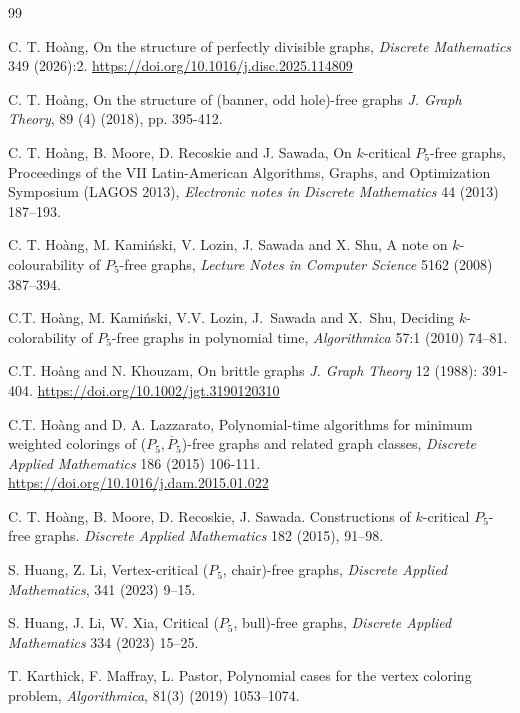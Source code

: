 \documentclass[a4paper,11pt]{article}
\theoremstyle{case}
\begin{document}
\begin{thebibliography}{99}

C. T. Ho\`ang,
On the structure of perfectly divisible graphs,
{\it Discrete Mathematics} 349 (2026):2. 
\url{https://doi.org/10.1016/j.disc.2025.114809}

C. T. Ho\`ang, On the structure of (banner, odd hole)-free graphs
{\it J. Graph Theory}, 89 (4) (2018), pp. 395-412.

    C. T. Ho\`ang, B. Moore, D. Recoskie and J. Sawada,
    On $k$-critical $P_5$-free graphs, Proceedings of the VII Latin-American
    Algorithms, Graphs, and Optimization Symposium (LAGOS 2013), {\sl
    Electronic notes in Discrete Mathematics} 44 (2013) 187--193.

    C. T. Ho\`{a}ng, M. Kami\'nski, V. Lozin, J. Sawada and X. Shu,
    A note on $k$-colourability of $P_5$-free graphs,
    {\sl Lecture Notes in Computer Science} 5162 (2008)
    387--394.

    C.T. Ho\`ang, M. Kami\'nski, V.V. Lozin, J.~Sawada and X.~Shu,
    Deciding $k$-colorability of $P_5$-free graphs in polynomial time,
    {\sl Algorithmica} 57:1  (2010) 74--81.

 C.T. Ho\`ang and N. Khouzam, On brittle graphs {\it J. Graph Theory}  12 (1988): 391-404. 
 \url{https://doi.org/10.1002/jgt.3190120310}



    C.T. Ho\`ang and D. A. Lazzarato, Polynomial-time algorithms for
    minimum weighted colorings of ($P_5, \overline{P}_5$)-free graphs and related graph classes,
{\it Discrete Applied Mathematics} 186 (2015) 106-111. \url{https://doi.org/10.1016/j.dam.2015.01.022}

C. T. Ho\`ang, B. Moore, D. Recoskie, J. Sawada. Constructions of $k$-critical $P_5$-free graphs. {\sl Discrete Applied Mathematics} 182 (2015), 91–98.

S. Huang, Z. Li, Vertex-critical ($P_5$, chair)-free graphs, 
{\sl Discrete Applied Mathematics}, 341 (2023) 9--15.

S. Huang, J. Li, W. Xia, 
Critical ($P_5$, bull)-free graphs, {\it Discrete Applied Mathematics}
 334 (2023) 15--25.

T. Karthick, F. Maffray, L. Pastor, Polynomial cases for the vertex coloring problem, {\it  Algorithmica}, 81(3) (2019) 1053--1074.


\end{thebibliography}
\end{document}
